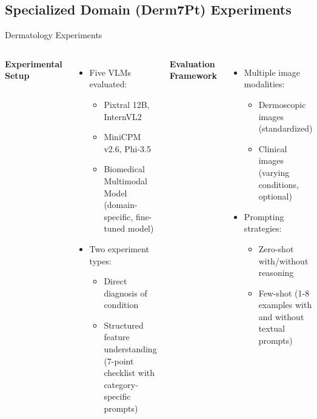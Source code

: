 \documentclass[aspectratio=169]{beamer}
\newcommand\customcolumnwidth{0.4625\textwidth}
\begin{document}
\subsection{Specialized Domain (Derm7Pt) Experiments}
\begin{frame}{Dermatology Experiments}
  \vspace{-1em}
  \begin{columns}[T]
    \column{\customcolumnwidth}
      \textbf{Experimental Setup}
      \begin{itemize}
        \item Five VLMs evaluated:
        \begin{itemize}
          \item Pixtral 12B, InternVL2
          \item MiniCPM v2.6, Phi-3.5
          \item Biomedical Multimodal Model (domain-specific, fine-tuned model)
        \end{itemize}
        \item Two experiment types:
        \begin{itemize}
          \item Direct diagnosis of condition
          \item Structured feature understanding (7-point checklist with category-specific prompts)
        \end{itemize}
      \end{itemize}
    \column{\customcolumnwidth}
      \textbf{Evaluation Framework}
      \begin{itemize}
        \item Multiple image modalities:
        \begin{itemize}
          \item Dermoscopic images (standardized)
          \item Clinical images (varying conditions, optional)
        \end{itemize}
        \item Prompting strategies:
        \begin{itemize}
          \item Zero-shot with/without reasoning
          \item Few-shot (1-8 examples with and without textual prompts)
        \end{itemize}
      \end{itemize}
    \end{columns}
\end{frame}
\end{document}
